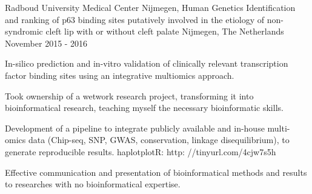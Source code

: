 

\begin{cventries}

  \cventry
    { Radboud University Medical Center Nijmegen, Human Genetics } %
    { Identification and ranking of p63 binding sites putatively involved in the etiology of non-syndromic cleft lip with or without cleft palate } %
    { Nijmegen, The Netherlands } %
    { November 2015 - 2016 } %
    { 
      \begin{cvitems} %
      \item { In-silico prediction and in-vitro validation of clinically relevant transcription factor binding sites using an integrative multiomics approach. }
      \item { Took ownership of a wetwork research project, transforming it into bioinformatical research, teaching myself the necessary bioinformatic skills. }
      \item { Development of a pipeline to integrate publicly available and in-house multi-omics data (Chip-seq, SNP, GWAS, conservation, linkage disequilibrium), to generate reproducible results. haplotplotR: http: //tinyurl.com/4cjw7s5h }
      \item { Effective communication and presentation of bioinformatical methods and results to researches with no bioinformatical expertise. }
      
      \end{cvitems}
    }



\end{cventries}
